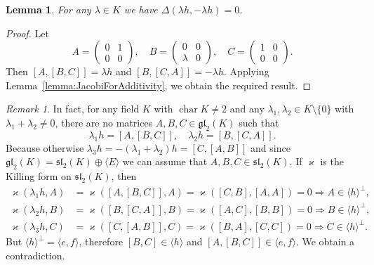 \documentclass[a4paper,reqno,12pt]{amsart}
\newtheorem{lemma}[proposition]{Lemma}
\theoremstyle{definition}
\theoremstyle{remark}
\newtheorem{remark}[proposition]{Remark}
\DeclareMathOperator{\Char}{char}
\def\gl{\mathfrak{gl}}
\def\sl{\mathfrak{sl}}
\begin{document}
	\begin{lemma}\label{lemma:additivityForHandMinusH}
		For any $\lambda \in K$ we have $\Delta(\lambda h, -\lambda h) = 0$.
	\end{lemma}

	\begin{proof}
		Let
		\begin{equation*}
			A = 
			\begin{pmatrix}
				0 & 1 \\
				0 & 0
			\end{pmatrix}, \quad
			B = 
			\begin{pmatrix}
				0 & 0 \\
				\lambda & 0
			\end{pmatrix}, \quad
			C = 
			\begin{pmatrix}
				1 & 0 \\
				0 & 0
			\end{pmatrix}.
		\end{equation*}
		Then $[A, [B, C]] = \lambda h$ and $[B, [C, A]] = -\lambda h$. Applying Lemma~\ref{lemma:JacobiForAdditivity}, we obtain the required result.
	\end{proof}

	\begin{remark}\label{remark:phiIsNotSurjective}
		In fact, for any field $K$ with $\Char K \neq 2$ and any $\lambda_1, \lambda_2 \in K \setminus \lbrace 0 \rbrace$ with $\lambda_1 + \lambda_2 \neq 0$, there are no matrices $A, B, C \in \gl_2(K)$ such that
		\begin{equation*}
			\lambda_1 h = [A, [B, C]], \quad \lambda_2 h = [B, [C, A]].
		\end{equation*}
		Because otherwise $\lambda_3 h = -(\lambda_1 + \lambda_2) h = [C, [A, B]]$ and since $\gl_2(K) = \sl_2(K) \oplus \langle E \rangle$ we can assume that $A, B, C \in \sl_2(K)$. If $\varkappa$ is the Killing form on $\sl_2(K)$, then
		\begin{align*}
			\varkappa(\lambda_1 h, A) &= \varkappa([A, [B, C]], A) = \varkappa([C, B], [A, A]) = 0 \Rightarrow A \in \langle h \rangle^{\perp}, \\
			\varkappa(\lambda_2 h, B) &= \varkappa([B, [C, A]], B) = \varkappa([A, C], [B, B]) = 0 \Rightarrow B \in \langle h \rangle^{\perp}, \\
			\varkappa(\lambda_3 h, C) &= \varkappa([C, [A, B]], C) = \varkappa([B, A], [C, C]) = 0 \Rightarrow C \in \langle h \rangle^{\perp}.
		\end{align*}
		But $\langle h \rangle^{\perp} = \langle e, f \rangle$, therefore $[B, C] \in \langle h \rangle$ and $[A, [B, C]] \in \langle e, f \rangle$. We obtain a contradiction.
	\end{remark}
\end{document}
